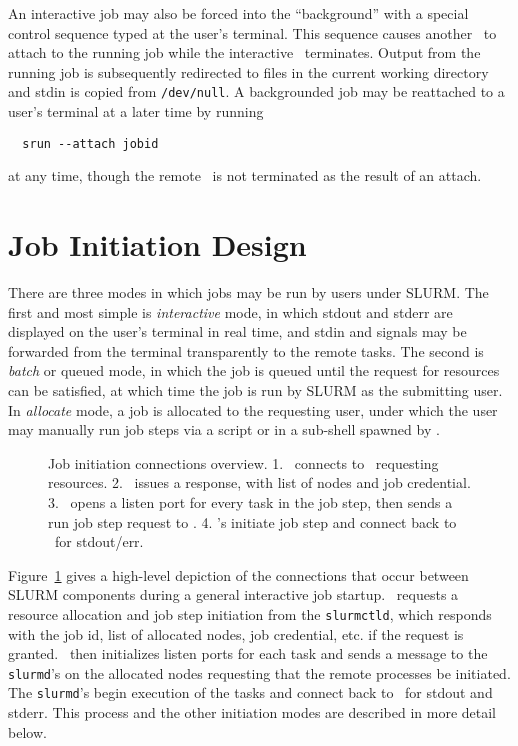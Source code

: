 An interactive job may also be forced into the ``background'' with a
special control sequence typed at the user's terminal. This sequence 
causes another \srun\ to attach to the running job while the interactive
\srun\ terminates. Output from the running job is subsequently 
redirected to files in the current working directory and stdin is
copied from {\tt /dev/null}. A backgrounded job may be reattached
to a user's terminal at a later time by running
\begin{verbatim}
  srun --attach jobid 
\end{verbatim}
at any time, though the remote \srun\ is not terminated as the result 
of an attach.

\section{Job Initiation Design}

There are three modes in which jobs may be run by users under SLURM. The
first and most simple is {\em interactive} mode, in which stdout and
stderr are displayed on the user's terminal in real time, and stdin and
signals may be forwarded from the  terminal transparently to the remote
tasks. The second is {\em batch} or {queued} mode, in which the job is
queued until the request for resources can be satisfied, at which time the
job is run by SLURM as the submitting user. In {\em allocate} mode,
a job is allocated to the requesting user, under which the user may
manually run job steps via a script or in a sub-shell spawned by \srun .

\begin{figure}[tb]
\centerline{}
\caption{\small Job initiation connections overview. 1. \srun\ connects to 
         \slurmctld\ requesting resources. 2. \slurmctld\ issues a response,
	 with list of nodes and job credential. 3. \srun\ opens a listen
	 port for every task in the job step, then sends a run job step
	 request to \slurmd . 4. \slurmd 's initiate job step and connect
	 back to \srun\ for stdout/err. }
\label{connections}
\end{figure}

Figure~\ref{connections} gives a high-level depiction of the connections
that occur between SLURM components during a general interactive job
startup. 
\srun\ requests a resource allocation and job step initiation from the {\tt slurmctld}, 
which responds with the job id, list of allocated nodes, job credential, etc.
if the request is granted. 
\srun\ then initializes listen ports for each
task and sends a message to the {\tt slurmd}'s on the allocated nodes requesting
that the remote processes be initiated. The {\tt slurmd}'s begin execution of
the tasks and connect back to \srun\ for stdout and stderr. This process and
the other initiation modes are described in more detail below.


